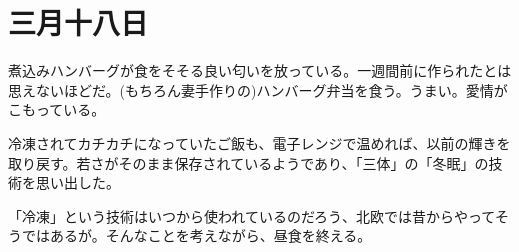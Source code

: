\chapter{三月十八日}

煮込みハンバーグが食をそそる良い匂いを放っている。一週間前に作られたとは思えないほどだ。(もちろん妻手作りの)ハンバーグ弁当を食う。うまい。愛情がこもっている。

冷凍されてカチカチになっていたご飯も、電子レンジで温めれば、以前の輝きを取り戻す。若さがそのまま保存されているようであり、「三体」の「冬眠」の技術を思い出した。

「冷凍」という技術はいつから使われているのだろう、北欧では昔からやってそうではあるが。そんなことを考えながら、昼食を終える。
